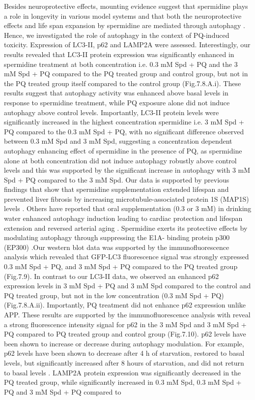 Besides neuroprotective effects, mounting evidence suggest that spermidine plays a role in longevity in various model systems \citep{Eisenberg2009,Garcia-Prat2016,Minois2012,Morselli2011,Pietrocola2015} and that both the neuroprotective effects and life span expansion by spermidine are mediated through autophagy \citep{Eisenberg2009,Gupta2016,Gupta2013,Minois2012,Yue2017}. Hence, we investigated the role of autophagy in the context of PQ-induced toxicity. Expression of LC3-II, p62 and LAMP2A were assessed. Interestingly, our results revealed that LC3-II protein expression was significantly enhanced in spermidine treatment at both concentration i.e. 0.3 mM Spd + PQ and the 3 mM Spd + PQ compared to the PQ treated group and control group, but not in the PQ treated group itself compared to the control group (Fig.7.8.A.i). These results suggest that autophagy activity was enhanced above basal levels in response to spermidine treatment, while PQ exposure alone did not induce autophagy above control levels. Importantly, LC3-II protein levels were significantly increased in the highest concentration spermidine i.e. 3 mM Spd + PQ compared to the 0.3 mM Spd + PQ, with no significant difference observed between 0.3 mM Spd and 3 mM Spd, suggesting a concentration dependent autophagy enhancing effect of spermidine in the presence of PQ, as spermidine alone at both concentration did not induce autophagy robustly above control levels and this was supported by the significant increase in autophagy with 3 mM Spd + PQ compared to the 3 mM Spd. Our data is supported by previous findings that show that spermidine supplementation extended lifespan and prevented liver fibrosis by increasing microtubule-associated protein 1S (MAP1S) levels \citep{Yue2017}. Others have reported that oral supplementation (0.3 or 3 mM) in drinking water enhanced autophagy induction leading to cardiac protection and lifespan extension \citep{Eisenberg2016a} and reversed arterial aging \citep{LaRocca2013}. Spermidine exerts its protective effects by modulating autophagy through suppressing the E1A- binding protein p300 (EP300) \citep{Pietrocola2015}.Our western blot data was supported by the immunofluorescence analysis which revealed that GFP-LC3 fluorescence signal was strongly expressed 0.3 mM Spd + PQ, and 3 mM Spd + PQ compared to the PQ treated group (Fig.7.9). In contrast to our LC3-II data, we observed an enhanced p62 expression levels in 3 mM Spd + PQ and 3 mM Spd compared to the control and PQ treated group, but not in the low concentration (0.3 mM Spd + PQ) (Fig.7.8.A.ii). Importantly, PQ treatment did not enhance p62 expression unlike APP. These results are supported by the immunofluorescence analysis with reveal a strong fluorescence intensity signal for p62 in the 3 mM Spd and 3 mM Spd + PQ compared to PQ treated group and control group (Fig.7.10). p62 levels have been shown to increase or decrease during autophagy modulation. For example, p62 levels have been shown to decrease after 4 h of starvation, restored to basal levels, but significantly increased after 8 hours of starvation, and did not return to basal levels \citep{sahani2014}. LAMP2A protein expression was significantly decreased in the PQ treated group, while significantly increased in 0.3 mM Spd, 0.3 mM Spd + PQ and 3 mM Spd + PQ compared to 